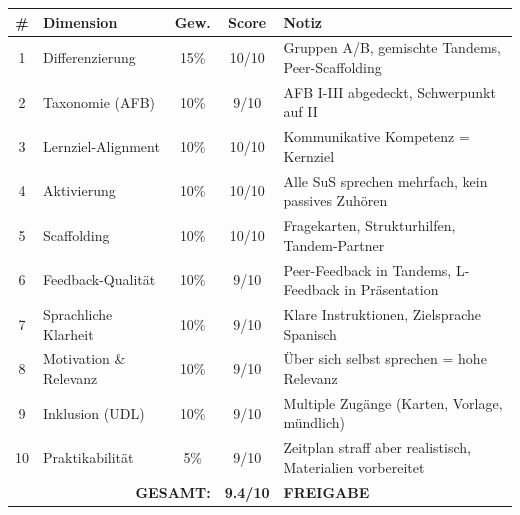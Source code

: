 \documentclass[11pt, a4paper]{article}
\begin{document}
\begin{center}
\begin{tabular}{|c|l|c|c|p{4.5cm}|}
    \hline
    \textbf{\#} & \textbf{Dimension} & \textbf{Gew.} & \textbf{Score} & \textbf{Notiz} \\
    \hline
    1 & Differenzierung & 15\% & 10/10 & Gruppen A/B, gemischte Tandems, Peer-Scaffolding \\
    \hline
    2 & Taxonomie (AFB) & 10\% & 9/10 & AFB I-III abgedeckt, Schwerpunkt auf II \\
    \hline
    3 & Lernziel-Alignment & 10\% & 10/10 & Kommunikative Kompetenz = Kernziel \\
    \hline
    4 & Aktivierung & 10\% & 10/10 & Alle SuS sprechen mehrfach, kein passives Zuhören \\
    \hline
    5 & Scaffolding & 10\% & 10/10 & Fragekarten, Strukturhilfen, Tandem-Partner \\
    \hline
    6 & Feedback-Qualität & 10\% & 9/10 & Peer-Feedback in Tandems, L-Feedback in Präsentation \\
    \hline
    7 & Sprachliche Klarheit & 10\% & 9/10 & Klare Instruktionen, Zielsprache Spanisch \\
    \hline
    8 & Motivation \& Relevanz & 10\% & 9/10 & Über sich selbst sprechen = hohe Relevanz \\
    \hline
    9 & Inklusion (UDL) & 10\% & 9/10 & Multiple Zugänge (Karten, Vorlage, mündlich) \\
    \hline
    10 & Praktikabilität & 5\% & 9/10 & Zeitplan straff aber realistisch, Materialien vorbereitet \\
    \hline
    \multicolumn{3}{|r|}{\textbf{GESAMT:}} & \textbf{9.4/10} & \textcolor{success}{\textbf{FREIGABE}} \\
    \hline
\end{tabular}
\end{center}

\vspace{1cm}

\begin{center}
\end{center}
\end{document}
